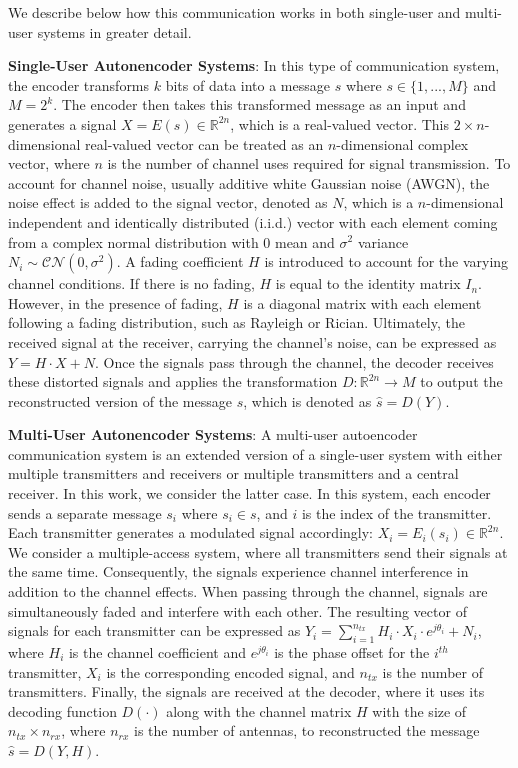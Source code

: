 We describe below how this communication works in both single-user and multi-user systems in greater detail.

\textbf{Single-User Autonencoder Systems}: In this type of communication system, the encoder transforms \(k\) bits of data into a message \(s\) where \(s \in \{1,...,M\}\) and \(M = 2^k\). The encoder then takes this transformed message as an input and generates a signal \(X = E(s) \in \mathbb{R}^{2n}\), which is a real-valued vector. This \(2 \times n\)-dimensional real-valued vector can be treated as an \(n\)-dimensional complex vector, where \(n\) is the number of channel uses required for signal transmission. To account for channel noise, usually additive white Gaussian noise (AWGN), the noise effect is added to the signal vector, denoted as \(N\), which is a \(n\)-dimensional independent and identically distributed (i.i.d.) vector with each element coming from a complex normal distribution with 0 mean and \(\sigma^2\) variance \(N_i \sim \mathcal{CN}(0, \sigma^2)\). A fading coefficient \(H\) is introduced to account for the varying channel conditions. If there is no fading, \(H\) is equal to the identity matrix \(I_n\). However, in the presence of fading, \(H\) is a diagonal matrix with each element following a fading distribution, such as Rayleigh or Rician. Ultimately, the received signal at the receiver, carrying the channel's noise, can be expressed as \(Y = H \cdot X + N\). Once the signals pass through the channel, the decoder receives these distorted signals and applies the transformation \(D: \mathbb{R}^{2n} \rightarrow M \) to output the reconstructed version of the message \(s\), which is  denoted as \(\hat{s} = D(Y)\).

\textbf{Multi-User Autonencoder Systems}: A multi-user autoencoder communication system is an extended version of a single-user system with either multiple transmitters and receivers or multiple transmitters and a central receiver. In this work, we consider the latter case. In this system, each encoder sends a separate message \(s_i\) where \(s_i \in s\), and \(i\) is the index of the transmitter. Each transmitter generates a modulated signal accordingly: \(X_i = E_i(s_i) \in \mathbb{R}^{2n}\). We consider a multiple-access system, where all transmitters send their signals at the same time. Consequently, the signals experience channel interference in addition to the channel effects. When passing through the channel, signals are simultaneously faded and interfere with each other. The resulting vector of signals for each transmitter can be expressed as \(Y_i = \sum_{i=1}^{n_{tx}} H_i \cdot X_i \cdot e^{j\theta_i} + N_i\), where \(H_i\) is the channel coefficient and \(e^{j\theta_i}\) is the phase offset for the \(i^{th}\) transmitter, \(X_i\) is the corresponding encoded signal, and \(n_{tx}\) is the number of transmitters. Finally, the signals are received at the decoder, where it uses its decoding function \(D(\cdot)\) along with the channel matrix \(H\) with the size of \(n_{tx} \times n_{rx}\), where \(n_{rx}\) is the number of antennas, to reconstructed the message \(\hat{s} = D(Y, H)\).
